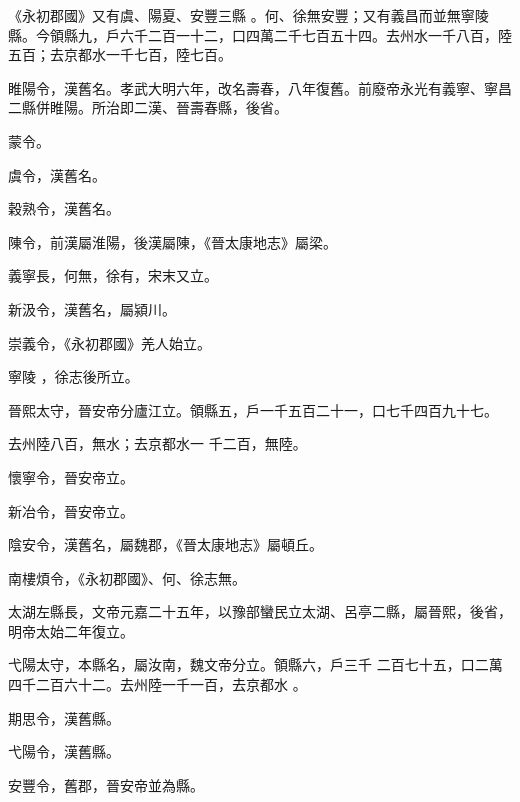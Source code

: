 \begin{pinyinscope}
《永初郡國》又有虞、陽夏、安豐三縣
 。何、徐無安豐；又有義昌而並無寧陵
 縣。今領縣九，戶六千二百一十二，口四萬二千七百五十四。去州水一千八百，陸五百；去京都水一千七百，陸七百。



 睢陽令，漢舊名。孝武大明六年，改名壽春，八年復舊。前廢帝永光有義寧、寧昌二縣併睢陽。所治即二漢、晉壽春縣，後省。


蒙令。



 虞令，漢舊名。



 穀熟令，漢舊名。



 陳令，前漢屬淮陽，後漢屬陳，《晉太康地志》屬梁。



 義寧長，何無，徐有，宋末又立。



 新汲令，漢舊名，屬潁川。



 崇義令，《永初郡國》羌人始立。


寧陵
 ，徐志後所立。



 晉熙太守，晉安帝分廬江立。領縣五，戶一千五百二十一，口七千四百九十七。



 去州陸八百，無水；去京都水一
 千二百，無陸。



 懷寧令，晉安帝立。



 新冶令，晉安帝立。



 陰安令，漢舊名，屬魏郡，《晉太康地志》屬頓丘。



 南樓煩令，《永初郡國》、何、徐志無。



 太湖左縣長，文帝元嘉二十五年，以豫部蠻民立太湖、呂亭二縣，屬晉熙，後省，明帝太始二年復立。


弋陽太守，本縣名，屬汝南，魏文帝分立。領縣六，戶三千
 二百七十五，口二萬四千二百六十二。去州陸一千一百，去京都水
 。



 期思令，漢舊縣。



 弋陽令，漢舊縣。



 安豐令，舊郡，晉安帝並為縣。




\end{pinyinscope}
